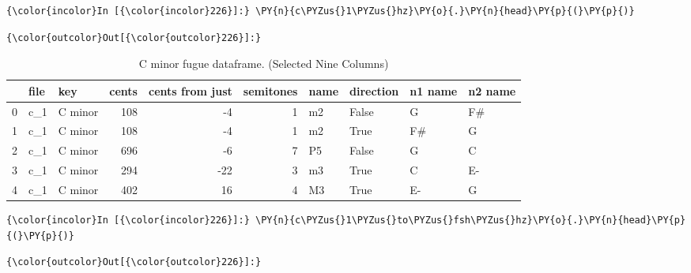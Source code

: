     \begin{Verbatim}[commandchars=\\\{\}]
{\color{incolor}In [{\color{incolor}226}]:} \PY{n}{c\PYZus{}1\PYZus{}hz}\PY{o}{.}\PY{n}{head}\PY{p}{(}\PY{p}{)}
\end{Verbatim}
\begin{Verbatim}[commandchars=\\\{\}]
{\color{outcolor}Out[{\color{outcolor}226}]:} 
\end{Verbatim}
\begin{singlespace}
\begin{table}[H]
\centering
\tiny
\begin{tabular}{|lllrrrllll|}
\hline
\textbf{{}} & \textbf{file} & \textbf{     key} & \textbf{ cents} & \textbf{ cents from just} & \textbf{ semitones} & \textbf{name} & \textbf{direction} & \textbf{n1 name} & \textbf{n2 name }\\
\hline
0 &  c\_1 &  C minor &    108 &               -4 &          1 &   m2 &     False &       G &      F\# \\
1 &  c\_1 &  C minor &    108 &               -4 &          1 &   m2 &      True &      F\# &       G \\
2 &  c\_1 &  C minor &    696 &               -6 &          7 &   P5 &     False &       G &       C \\
3 &  c\_1 &  C minor &    294 &              -22 &          3 &   m3 &      True &       C &      E- \\
4 &  c\_1 &  C minor &    402 &               16 &          4 &   M3 &      True &      E- &       G \\
\hline
\end{tabular}
\caption{C minor fugue dataframe. (Selected Nine Columns) }
\end{table}
\normalsize
\end{singlespace}
    \begin{Verbatim}[commandchars=\\\{\}]
{\color{incolor}In [{\color{incolor}226}]:} \PY{n}{c\PYZus{}1\PYZus{}to\PYZus{}fsh\PYZus{}hz}\PY{o}{.}\PY{n}{head}\PY{p}{(}\PY{p}{)}
\end{Verbatim}
\begin{Verbatim}[commandchars=\\\{\}]
{\color{outcolor}Out[{\color{outcolor}226}]:} 
\end{Verbatim}
